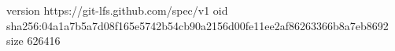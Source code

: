 version https://git-lfs.github.com/spec/v1
oid sha256:04a1a7b5a7d08f165e5742b54cb90a2156d00fe11ee2af86263366b8a7eb8692
size 626416

